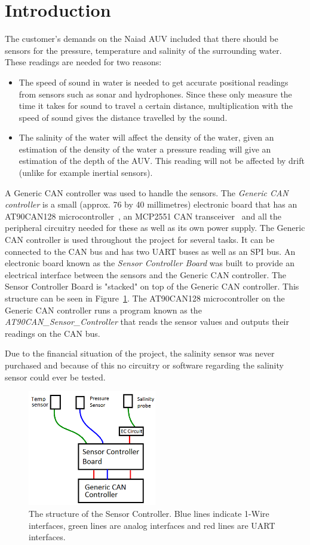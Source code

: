 
\section{Introduction}\label{sec:introduction}
The customer's demands on the Naiad AUV included that there should be sensors for the pressure, temperature and salinity of the surrounding water. These readings are needed for two reasons: 

\begin{itemize}
\item The speed of sound in water is needed to get accurate positional readings from sensors such as sonar and hydrophones. Since these only measure the time it takes for sound to travel a certain distance, multiplication with the speed of sound gives the distance travelled by the sound.

\item The salinity of the water will affect the density of the water, given an estimation of the density of the water a pressure reading will give an estimation of the depth of the AUV. This reading will not be affected by drift (unlike for example inertial sensors).

\end{itemize}

A Generic CAN controller was used to handle the sensors. The \emph{Generic CAN controller} is a small (approx. 76 by 40 millimetres) electronic board that has an AT90CAN128 microcontroller~\cite{web:at90can}, an MCP2551 CAN transceiver~\cite{web:mcp2551} and all the peripheral circuitry needed for these as well as its own power supply. The Generic CAN controller is used throughout the project for several tasks. It can be connected to the CAN bus and has two UART buses as well as an SPI bus. \newline
An electronic board known as the \emph{Sensor Controller Board} was built to provide an electrical interface between the sensors and the Generic CAN controller. The Sensor Controller Board is "stacked" on top of the Generic CAN controller. This structure can be seen in Figure~\ref{fig:sensor_overview}.  \newline
The AT90CAN128 microcontroller on the Generic CAN controller runs a program known as the \newline
\emph{AT90CAN\_Sensor\_Controller} that reads the sensor values and outputs their readings on the CAN bus.

Due to the financial situation of the project, the salinity sensor was never purchased and because of this no circuitry or software regarding  the salinity sensor could ever be tested. 

\begin{figure}[h]
    \includegraphics[width=0.5\textwidth]{./figure/sensor_overview.png}
    \caption{The structure of the Sensor Controller. Blue lines indicate 1-Wire interfaces, green lines are analog interfaces and red lines are UART interfaces.}
    \label{fig:sensor_overview}
\end{figure}